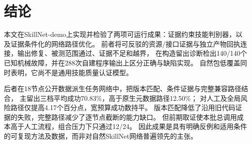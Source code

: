 \section{结论}
本文在SkillNet-demo上实现并检验了两项可运行成果：证据约束技能判别器，以及证据条件化的网络路径优化。
前者将可反驳的资源/接口证据与独立产物回执连接，输出修复、被测范围通过、证据不足和越界，
在构造留出诊断检出140/140个已知机械故障，并在288次自建程序输出上区分正确与缺陷实现。
自然包低覆盖同时表明，它尚不是通用技能质量认证模型。

后者在18节点公开数据派生任务网络中，把版本匹配、条件证据与完整兼容路径结合，
主留出三档平均成功70.83\%，高于原生元数据路径12.50\%；
对人工及全局风险路径仅提高4.17个百分点，宽预算成功数持平。
版本匹配降低了沿用旧代码证据的失败，完整路径减少了逐节点截断的能力缺口。
但前期取证使本批总调用成本高于人工流程，组合压力下只通过12/24。
因此成果是具有明确反例和适用条件的可复现方法及数据，而非对自然SkillNet网络普遍领先的主张。
